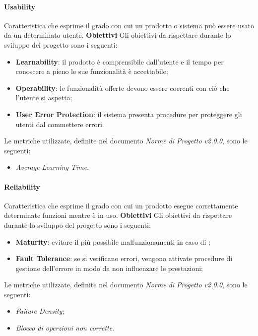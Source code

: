 \paragraph{Usability} \Spazio
	Caratteristica che esprime il grado con cui un prodotto o sistema può essere usato da un determinato utente.\Spazio
	\textbf{Obiettivi} \Spazio
	Gli obiettivi da rispettare durante lo sviluppo del progetto sono i seguenti:
	\begin{itemize}
		\item{\textbf{Learnability}: il prodotto è comprensibile dall'utente e il tempo per conoscere a pieno le sue funzionalità è accettabile;
		}
		\item{\textbf{Operability}: le funzionalità offerte devono essere coerenti con ciò che l'utente si aspetta;
		}
		\item{\textbf{User Error Protection}: il sistema presenta procedure per proteggere gli utenti dal commettere errori.
		}
	\end{itemize}
	Le metriche utilizzate, definite nel documento \emph{Norme di Progetto v2.0.0}, sono le seguenti:
	\begin{itemize}
		\item{\emph{Average Learning Time}.}
	\end{itemize}

\paragraph{Reliability} \Spazio
	Caratteristica che esprime il grado con cui un prodotto esegue correttamente determinate funzioni  mentre è in uso.\Spazio
	\textbf{Obiettivi} \Spazio
	Gli obiettivi da rispettare durante lo sviluppo del progetto sono i seguenti:
	\begin{itemize}
		\item{\textbf{Maturity}: evitare il più possibile malfunzionamenti in caso di ;
		}
		\item{\textbf{Fault Tolerance}: se si verificano errori, vengono attivate procedure di gestione dell'errore in modo da non influenzare le prestazioni;
		}
	\end{itemize}
	Le metriche utilizzate, definite nel documento \emph{Norme di Progetto v2.0.0}, sono le seguenti:
	\begin{itemize}
		\item{\emph{Failure Density};}
		\item{\emph{Blocco di operzioni non corrette}.}
	\end{itemize}

